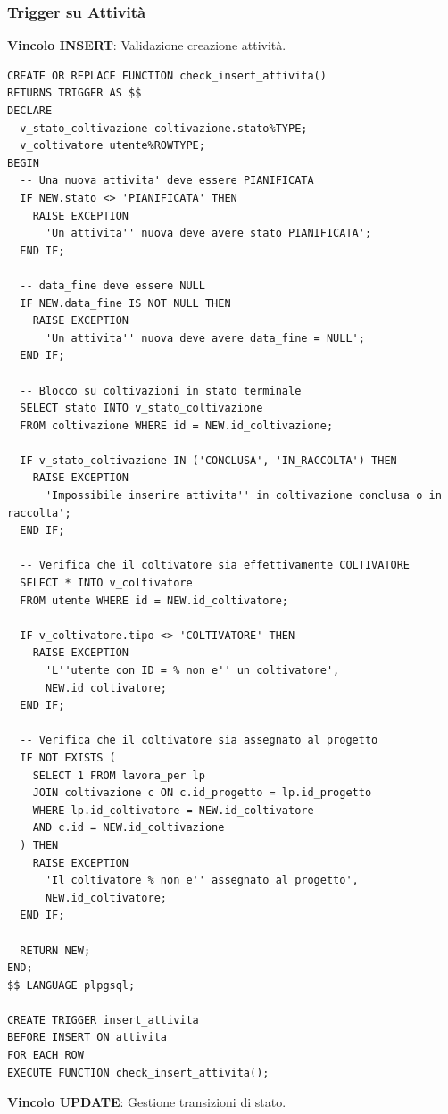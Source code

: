 \documentclass[12pt,a4paper]{article}
\begin{document}
\subsubsection{Trigger su Attività}

\textbf{Vincolo INSERT}: Validazione creazione attività.

\begin{lstlisting}[style=sqlstyle]
CREATE OR REPLACE FUNCTION check_insert_attivita()
RETURNS TRIGGER AS $$
DECLARE 
  v_stato_coltivazione coltivazione.stato%TYPE;
  v_coltivatore utente%ROWTYPE;
BEGIN
  -- Una nuova attivita' deve essere PIANIFICATA
  IF NEW.stato <> 'PIANIFICATA' THEN 
    RAISE EXCEPTION 
      'Un attivita'' nuova deve avere stato PIANIFICATA';
  END IF;

  -- data_fine deve essere NULL
  IF NEW.data_fine IS NOT NULL THEN 
    RAISE EXCEPTION 
      'Un attivita'' nuova deve avere data_fine = NULL';
  END IF;

  -- Blocco su coltivazioni in stato terminale
  SELECT stato INTO v_stato_coltivazione 
  FROM coltivazione WHERE id = NEW.id_coltivazione;

  IF v_stato_coltivazione IN ('CONCLUSA', 'IN_RACCOLTA') THEN
    RAISE EXCEPTION 
      'Impossibile inserire attivita'' in coltivazione conclusa o in raccolta';
  END IF;

  -- Verifica che il coltivatore sia effettivamente COLTIVATORE
  SELECT * INTO v_coltivatore
  FROM utente WHERE id = NEW.id_coltivatore;

  IF v_coltivatore.tipo <> 'COLTIVATORE' THEN 
    RAISE EXCEPTION 
      'L''utente con ID = % non e'' un coltivatore', 
      NEW.id_coltivatore;
  END IF;

  -- Verifica che il coltivatore sia assegnato al progetto
  IF NOT EXISTS (
    SELECT 1 FROM lavora_per lp
    JOIN coltivazione c ON c.id_progetto = lp.id_progetto
    WHERE lp.id_coltivatore = NEW.id_coltivatore
    AND c.id = NEW.id_coltivazione
  ) THEN
    RAISE EXCEPTION 
      'Il coltivatore % non e'' assegnato al progetto', 
      NEW.id_coltivatore;
  END IF;

  RETURN NEW;
END;
$$ LANGUAGE plpgsql;

CREATE TRIGGER insert_attivita
BEFORE INSERT ON attivita
FOR EACH ROW
EXECUTE FUNCTION check_insert_attivita();
\end{lstlisting}

\textbf{Vincolo UPDATE}: Gestione transizioni di stato.
\end{document}
